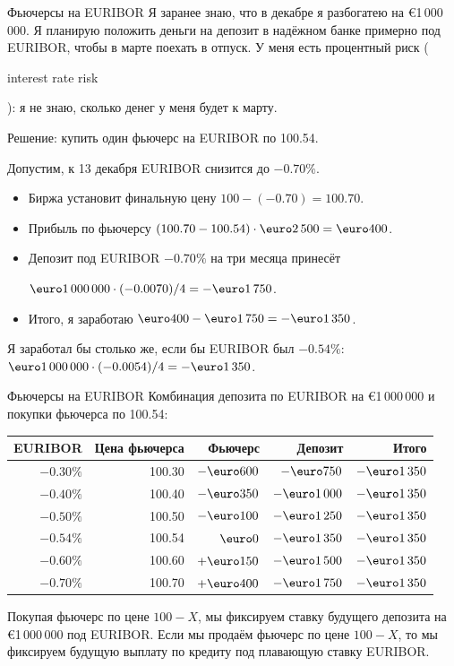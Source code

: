 \documentclass{beamer}
\renewcommand{\EUR}[1]{\textup{\euro}#1}
\newcommand{\en}[1]{\begin{otherlanguage}{english}#1\end{otherlanguage}}
\begin{document}
\begin{frame}{Фьючерсы на EURIBOR}
\justify
Я заранее знаю, что в декабре я разбогатею на \EUR{1\,000\,000}. Я планирую положить деньги на депозит в надёжном банке примерно под EURIBOR, чтобы в марте поехать в отпуск. У меня есть \alert{процентный риск} (\en{interest rate risk}): я не знаю, сколько денег у меня будет к марту.

\justify
Решение: купить один фьючерс на EURIBOR по 100.54.

\justify
Допустим, к 13 декабря EURIBOR снизится до $-0.70\%$.
\begin{itemize}
\justifying
\item Биржа установит финальную цену $100 - (-0.70) = 100.70$.
\item Прибыль по фьючерсу $(100.70-100.54)\cdot\EUR{2\,500} = \EUR{400}$.
\item Депозит под EURIBOR $-0.70\%$ на три месяца принесёт

$\EUR{1\,000\,000} \cdot (-0.0070) / 4 = -\EUR{1\,750}$.
\item Итого, я заработаю $\EUR{400} - \EUR{1\,750} = -\EUR{1\,350}$.
\end{itemize} 

\justify
Я заработал бы столько же, если бы EURIBOR был $-0.54\%$: $\EUR{1\,000\,000} \cdot (-0.0054)/4 =-\EUR{1\,350}$.
\end{frame}



\begin{frame}{Фьючерсы на EURIBOR}
\justify
Комбинация депозита по EURIBOR на \EUR{1\,000\,000} и покупки фьючерса по 100.54:

\justify
\centering
\begin{tabular}{r|r|r|r|r}
EURIBOR   & Цена фьючерса & Фьючерс      & Депозит & Итого \\ \hline
$-0.30\%$ & 100.30        & $-\EUR{600}$ & $-\EUR{750}$    & $-\EUR{1\,350}$ \\
$-0.40\%$ & 100.40        & $-\EUR{350}$ & $-\EUR{1\,000}$ & $-\EUR{1\,350}$ \\
$-0.50\%$ & 100.50        & $-\EUR{100}$ & $-\EUR{1\,250}$ & $-\EUR{1\,350}$ \\
$-0.54\%$ & 100.54        & $\EUR{0}$    & $-\EUR{1\,350}$ & $-\EUR{1\,350}$ \\
$-0.60\%$ & 100.60        & $+\EUR{150}$ & $-\EUR{1\,500}$ & $-\EUR{1\,350}$ \\
$-0.70\%$ & 100.70        & $+\EUR{400}$ & $-\EUR{1\,750}$ & $-\EUR{1\,350}$
\end{tabular}

\justify
Покупая фьючерс по цене $100-X$, мы фиксируем ставку будущего депозита на \EUR{1\,000\,000} под EURIBOR. Если мы продаём фьючерс по цене $100-X$, то мы фиксируем будущую выплату по кредиту под плавающую ставку EURIBOR.
\end{frame}
\end{document}
